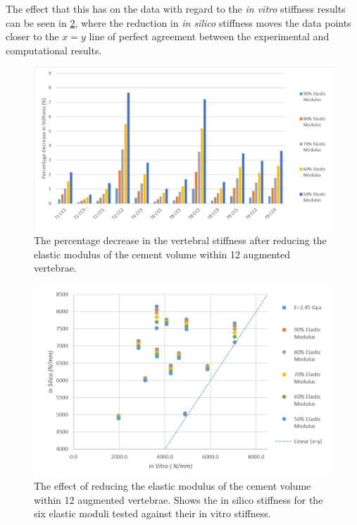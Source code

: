 The effect that this has on the data with regard to the \textit{in vitro} stiffness results can be seen in \cref{fig:redEModscatter}, where the reduction in \textit{in silico} stiffness moves the data points closer to the $x = y$ line of perfect agreement between the experimental and computational results.


\begin{figure}[ht!]
\centering
\includegraphics[width=\textwidth]{images/reductionOfEMod_Bar.png}
\caption{The percentage decrease in the vertebral stiffness after reducing the elastic modulus of the cement volume within 12 augmented vertebrae.}
\label{fig:redEModBar}
\end{figure}

\begin{figure}[ht!]
\centering
\includegraphics[width=5.3in]{images/reductionOfEMod_Scatter.png}
\caption{The effect of reducing the elastic modulus of the cement volume within 12 augmented vertebrae. Shows the in silico stiffness for the six elastic moduli tested against their in vitro stiffness. }
\label{fig:redEModscatter}
\end{figure}

